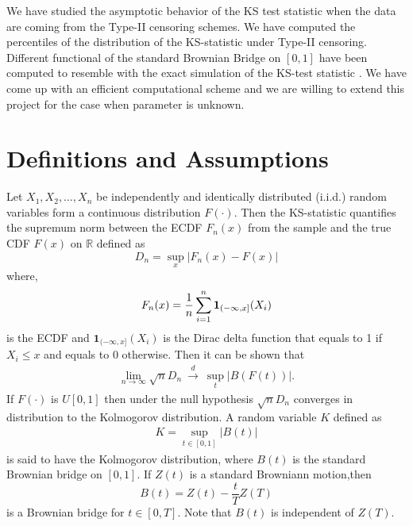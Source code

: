 \documentclass[12pt, reqno]{amsart}
\begin{document}
We have  studied  the asymptotic behavior of the KS test statistic when the data are coming from the Type-II censoring schemes. We have  computed the percentiles of the distribution of the KS-statistic under Type-II censoring.  Different functional of the standard Brownian Bridge on $[0,1]$  have been computed to resemble with the exact simulation of the KS-test statistic . We have come up with an efficient computational scheme and we are willing  to extend this project for the case when  parameter is  unknown.  

\section{Definitions and Assumptions}
Let  $X_1, X_2, \ldots ,X_n$ be independently and identically distributed (i.i.d.) random variables form a continuous distribution $F(\cdot).$ Then 
the KS-statistic quantifies the  supremum norm  between the ECDF $F_n(x)$ from the sample and the true CDF $F(x)$ on $\mathbb{R}$ defined as 
\begin{equation}
         {\displaystyle D_{n}=\sup _{x}|F_{n}(x)-F(x)|}
 \end{equation}
where, 
\begin{align}
    {\displaystyle F_{n}(x)={1 \over n}\sum _{i=1}^{n}\mathbf{1}_{(-\infty,x]}(X_{i})}
\end{align}
 is the ECDF and
   ${\displaystyle \mathbf{1}_{(-\infty ,x]}(X_{i})}$ 
   is the Dirac delta function that  equals to 1 if ${\displaystyle X_{i}\leq x} $ and equals to 0 otherwise. Then it can be shown that \cite[see][Ch 8]{Durrett}
 \begin{align}
    {\displaystyle {\lim_{n \to \infty} \sqrt {n}}D_{n}~ \xrightarrow[]{d}~ \sup _{t}|B(F(t))|.}
 \end{align} 
 If $F(\cdot)$ is $U[0,1]$ then under the null hypothesis  ${\displaystyle {\sqrt {n}}D_{n}}$ converges in distribution  to the Kolmogorov distribution. A random variable $K$ defined as  
 \begin{align}
      {\displaystyle K=\sup _{t\in [0,1]}|B(t)|}
  \end{align}
is said to have the Kolmogorov distribution, where $B(t)$ is the standard Brownian bridge on $[0,1]$.  If $Z(t)$ is a standard Browniann motion,then
  \begin{equation}
      {\displaystyle B(t)=Z(t)-{\frac {t}{T}} Z(T)}
  \end{equation}
is a Brownian bridge for $ t \in [0, T] $. Note that $B(t)$ is independent of $Z(T)$.
\end{document}
